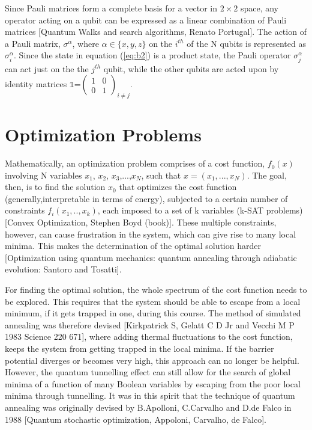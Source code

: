 \documentclass[../main.tex]{subfiles}
\begin{document}
Since Pauli matrices form a complete basis for a vector in $2 \times 2$ space, any operator acting on a qubit can be expressed as a linear combination of Pauli matrices [Quantum Walks and search algorithms, Renato Portugal]. The action of a Pauli matrix, $\sigma^\alpha$, where $\alpha \in \{x,y,z\}$ on the $i^{th}$ of the N qubits is represented as $\sigma_i^\alpha$. Since the state in equation (\ref{eq:b2}) is a product state, the Pauli operator $\sigma_j^\alpha$ can act just on the the $j^{th}$ qubit, while the other qubits are acted upon by identity matrices $\mathbb{1}$=$\begin{pmatrix}
1&0\\
0&1
\end{pmatrix}_{i \neq j}
$.\\
\section{Optimization Problems}
Mathematically, an optimization problem comprises of a cost function, $f_0(x)$ involving N variables $x_1$, $x_2$, $x_3$,...,$x_N$, such that $x=(x_1,...,x_N)$. The goal, then, is to find the solution $x_0$ that optimizes the cost function (generally,interpretable in terms of energy), subjected to a certain number of constraints $f_i(x_1,..,x_k)$, each imposed to a set of k variables (k-SAT problems)[Convex Optimization, Stephen Boyd (book)]. These multiple constraints, however, can cause frustration in the system, which can give rise to many local minima. This makes the determination of the optimal solution harder [Optimization using quantum mechanics: quantum annealing through adiabatic evolution: Santoro and Tosatti].

For finding the optimal solution, the whole spectrum of the cost function needs to be explored. This requires that the system should be able to escape from a local minimum, if it gets trapped in one, during this course. The method of simulated annealing was therefore devised [Kirkpatrick S, Gelatt C D Jr and Vecchi M P 1983 Science 220 671], where adding thermal fluctuations to the cost function, keeps the system from getting trapped in the local minima. If the barrier potential diverges or becomes very high, this approach can no longer be helpful. However, the quantum tunnelling effect can still allow for the search of global minima of a function of many Boolean variables by escaping from the poor local minima through tunnelling. It was in this spirit that the technique of quantum annealing was originally devised by B.Apolloni, C.Carvalho and D.de Falco in 1988 [Quantum stochastic optimization, Appoloni, Carvalho, de Falco].
\end{document}
